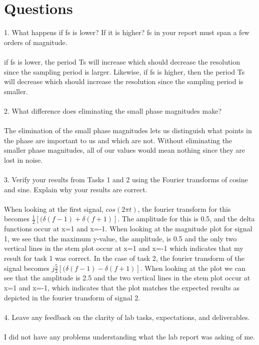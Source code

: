 \documentclass[12pt]{report}
\begin{document}
\section{Questions}
1. What happens if fs is lower? If it is higher? fs in your report must span a few orders of magnitude.
\\\\
if fs is lower, the period Ts will increase which should decrease the resolution since the sampling period is larger. Likewise, if fs is higher, then the period Ts will decrease which should increase the resolution since the sampling period is smaller.
\\\\
2. What difference does eliminating the small phase magnitudes make?
\\\\
The elimination of the small phase magnitudes lets us distinguish what points in the phase are important to us and which are not. Without eliminating the smaller phase magnitudes, all of our values would mean nothing since they are lost in noise.
\\\\
3. Verify your results from Tasks 1 and 2 using the Fourier transforms of cosine and sine. Explain why your results are correct.
\\\\
When looking at the first signal, \(cos(2\pi t)\), the fourier transform for this becomes \(\frac{1}{2}[(\delta(f-1)+\delta(f+1)]\). The amplitude for this is 0.5, and the delta functions occur at x=1 and x=-1. When looking at the magnitude plot for signal 1, we see that the maximum y-value, the amplitude, is 0.5 and the only two vertical lines in the stem plot occur at x=1 and x=-1 which indicates that my result for task 1 was correct. In the case of task 2, the fourier transform of the signal becomes \(j\frac{5}{2}[(\delta(f-1)-\delta(f+1)]\). When looking at the plot we can see that the amplitude is 2.5 and the two vertical lines in the stem plot occur at x=1 and x=-1, which indicates that the plot matches the expected results as depicted in the fourier transform of signal 2.
\\\\
4. Leave any feedback on the clarity of lab tasks, expectations, and deliverables.
\\\\
I did not have any problems understanding what the lab report was asking of me.
\end{document}
